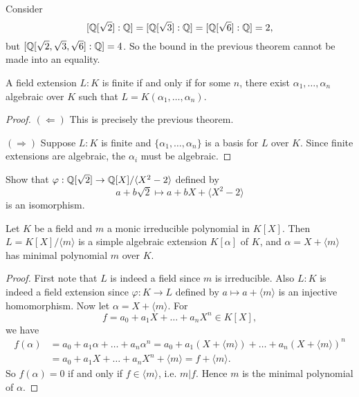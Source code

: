 \begin{example}
  Consider
  \[
    [\mathbb{Q}[\sqrt{2}] : \mathbb{Q}] = [\mathbb{Q}[\sqrt{3}] : \mathbb{Q}]
    = [\mathbb{Q}[\sqrt{6}] : \mathbb{Q}] = 2,
  \]
  but $[\mathbb{Q}[\sqrt{2}, \sqrt{3}, \sqrt{6}] : \mathbb{Q}] = 4$.
  So the bound in the previous theorem cannot be made
  into an equality.
\end{example}

\begin{prop}
  A field extension $L : K$ is finite if and only if
  for some $n$, there exist $\alpha_1, \dots, \alpha_n$
  algebraic over $K$ such that
  $L = K(\alpha_1, \dots, \alpha_n)$.
\end{prop}

\begin{proof}
  $(\Leftarrow)$ This is precisely the previous theorem.

  $(\Rightarrow)$ Suppose $L : K$ is finite and
  $\{\alpha_1, \dots, \alpha_n\}$ is a basis for $L$
  over $K$. Since finite extensions are algebraic,
  the $\alpha_i$ must be algebraic.
\end{proof}

\begin{exercise}
  Show that $\varphi : \mathbb{Q}[\sqrt{2}] \to \mathbb{Q}[X] / \langle X^2 - 2 \rangle$
  defined by
  \[a + b\sqrt{2} \mapsto a + bX + \langle X^2 - 2 \rangle\]
  is an isomorphism.
\end{exercise}

\begin{theorem}
  Let $K$ be a field and $m$ a monic irreducible
  polynomial in $K[X]$. Then $L = K[X] / \langle m \rangle$
  is a simple algebraic extension $K[\alpha]$ of $K$,
  and $\alpha = X + \langle m \rangle$ has minimal
  polynomial $m$ over $K$.
\end{theorem}

\begin{proof}
  First note that $L$ is indeed a field since $m$
  is irreducible. Also $L : K$ is indeed a field
  extension since $\varphi : K \to L$ defined by
  $a \mapsto a + \langle m \rangle$ is an injective
  homomorphism. Now let $\alpha = X + \langle m \rangle$.
  For
  \[
    f = a_0 + a_1 X + \dots + a_n X^n \in K[X],
  \]
  we have
  \begin{align*}
    f(\alpha)
    &= a_0 + a_1 \alpha + \dots + a_n \alpha^n
    = a_0 + a_1 (X + \langle m \rangle) + \dots + a_n (X + \langle m \rangle)^n \\
    &= a_0 + a_1 X + \dots + a_n X^n + \langle m \rangle
    = f + \langle m \rangle.
  \end{align*}
  So $f(\alpha) = 0$ if and only if
  $f \in \langle m \rangle$, i.e. $m | f$. Hence
  $m$ is the minimal polynomial of $\alpha$.
\end{proof}
